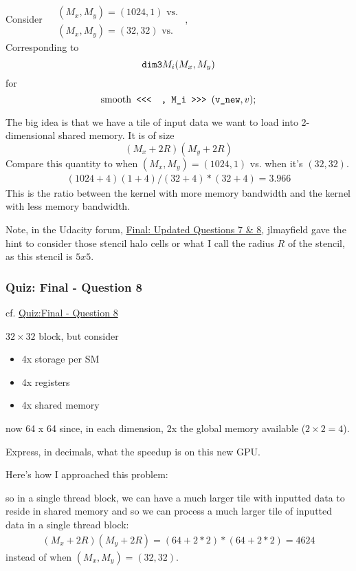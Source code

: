 \documentclass[10pt]{amsart}
\begin{document}
\begin{multicols*}{2}
Consider $\begin{aligned} & \quad \\
  & (M_x,M_y) = (1024, 1) \text{ vs. } \\ 
  & (M_x,M_y) = (32, 32) \text{ vs. } \end{aligned}$,  \\
Corresponding to
\[
\verb|dim3| M_i(M_x,M_y)
\]
for
\[
\text{smooth} \verb| <<<  , M_i >>> |( \verb|v_new|, v) ;
\]

The big idea is that we have a tile of input data we want to load into 2-dimensional shared memory.  It is of size
\begin{equation}
  (M_x + 2R) (M_y + 2R)
\end{equation}
Compare this quantity to when $(M_x,M_y) = (1024,1)$ vs. when it's $(32,32)$.
\[
\begin{gathered}
  (1024 +4 )(1+4) / (32 +4)*(32 +4) = \boxed{ 3.966 }
  \end{gathered}
\]
This is the ratio between the kernel with more memory bandwidth and the kernel with less memory bandwidth.  

Note, in the Udacity forum, \href{https://discussions.udacity.com/t/final-updated-questions-7-8/88801/2}{Final: Updated Questions 7 \& 8}, jlmayfield gave the hint to consider those stencil halo cells or what I call the radius $R$ of the stencil, as this stencil is $5x5$.    

\subsubsection{Quiz: Final - Question 8}

cf. \href{https://classroom.udacity.com/courses/cs344/lessons/2133758814/concepts/1421890280923}{Quiz:Final - Question 8}

$32 \times 32 $ block, but consider
\begin{itemize}
\item 4x storage per SM
\item 4x registers
\item 4x shared memory
  \end{itemize}
now 64 x 64 since, in each dimension, 2x the global memory available ($2\times 2 = 4$).  

Express, in decimals, what the speedup is on this new GPU.

Here's how I approached this problem:  

so in a single thread block, we can have a much larger tile with inputted data to reside in shared memory and so we can process a much larger tile of inputted data in a single thread block:
\begin{equation}
\begin{gathered}
  (M_x + 2R)(M_y + 2R) = ( 64 + 2*2)*(64 + 2*2) = 4624
\end{gathered}
\end{equation}
instead of when $(M_x,M_y)=(32,32)$.


\end{multicols*}
\end{document}
